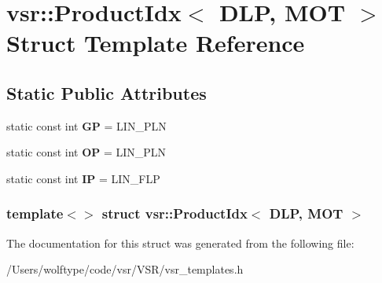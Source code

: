 \hypertarget{structvsr_1_1_product_idx_3_01_d_l_p_00_01_m_o_t_01_4}{\section{vsr\-:\-:Product\-Idx$<$ D\-L\-P, M\-O\-T $>$ Struct Template Reference}
\label{structvsr_1_1_product_idx_3_01_d_l_p_00_01_m_o_t_01_4}
}
\subsection*{Static Public Attributes}
\begin{DoxyCompactItemize}
\item 
\hypertarget{structvsr_1_1_product_idx_3_01_d_l_p_00_01_m_o_t_01_4_a2e5ec7a3764c89861c1f71bb9df5d752}{static const int {\bfseries G\-P} = L\-I\-N\-\_\-\-P\-L\-N}\label{structvsr_1_1_product_idx_3_01_d_l_p_00_01_m_o_t_01_4_a2e5ec7a3764c89861c1f71bb9df5d752}

\item 
\hypertarget{structvsr_1_1_product_idx_3_01_d_l_p_00_01_m_o_t_01_4_a1f48499f74e2ad139c9e665f0502144d}{static const int {\bfseries O\-P} = L\-I\-N\-\_\-\-P\-L\-N}\label{structvsr_1_1_product_idx_3_01_d_l_p_00_01_m_o_t_01_4_a1f48499f74e2ad139c9e665f0502144d}

\item 
\hypertarget{structvsr_1_1_product_idx_3_01_d_l_p_00_01_m_o_t_01_4_a12bc6afbde2a3b71663223606d35b015}{static const int {\bfseries I\-P} = L\-I\-N\-\_\-\-F\-L\-P}\label{structvsr_1_1_product_idx_3_01_d_l_p_00_01_m_o_t_01_4_a12bc6afbde2a3b71663223606d35b015}

\end{DoxyCompactItemize}
\subsubsection*{template$<$$>$ struct vsr\-::\-Product\-Idx$<$ D\-L\-P, M\-O\-T $>$}



The documentation for this struct was generated from the following file\-:\begin{DoxyCompactItemize}
\item 
/\-Users/wolftype/code/vsr/\-V\-S\-R/vsr\-\_\-templates.\-h\end{DoxyCompactItemize}
